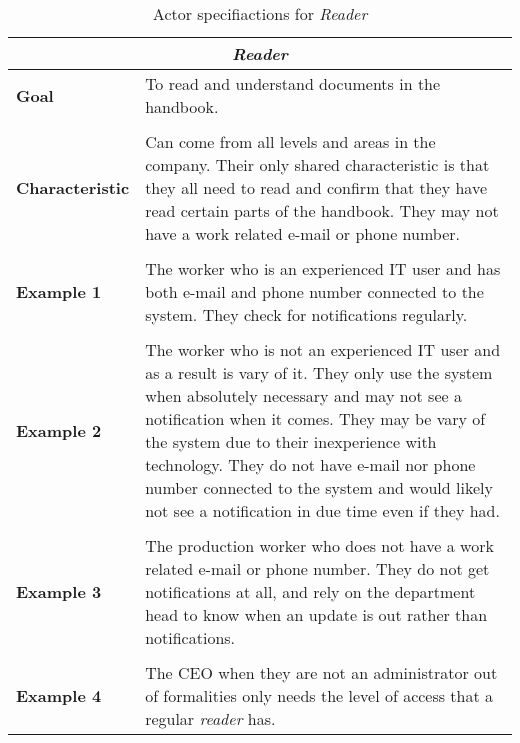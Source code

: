 \begin{table}[H]
	\begin{tabular}{l p{11.3cm}}
		\hline
		\multicolumn{2}{c}{\textbf{\textit{Reader}}}\\
		\hline
		
		\textbf{Goal} & To read and understand documents in the handbook. \\
		&  \\
		
		\textbf{Characteristic} & Can come from all levels and areas in the company.
		Their only shared characteristic is that they all need to read and confirm that they have read certain parts of the handbook.
		They may not have a work related e-mail or phone number.\\
		&  \\
		
		\textbf{Example 1}
		& The worker who is an experienced IT user and has both e-mail and phone number connected to the system.
		They check for notifications regularly.\\
		&  \\
		\textbf{Example 2}
		& The worker who is not an experienced IT user and as a result is vary of it. 
		They only use the system when absolutely necessary and may not see a notification when it comes.
		They may be vary of the system due to their inexperience with technology.
		They do not have e-mail nor phone number connected to the system and would likely not see a notification in due time even if they had.\\
		&  \\
		
		\textbf{Example 3}
		& The production worker who does not have a work related e-mail or phone number. 
		They do not get notifications at all, and rely on the department head to know when an update is out rather than notifications.\\
		&  \\
		
		\textbf{Example 4}
		& The CEO when they are not an administrator out of formalities only needs the level of access that a regular \textit{reader} has.\\		
		
		\hline
	\end{tabular}
	\caption{Actor specifiactions for \textit{Reader}}\label{tab:Actor-reader}
\end{table}

